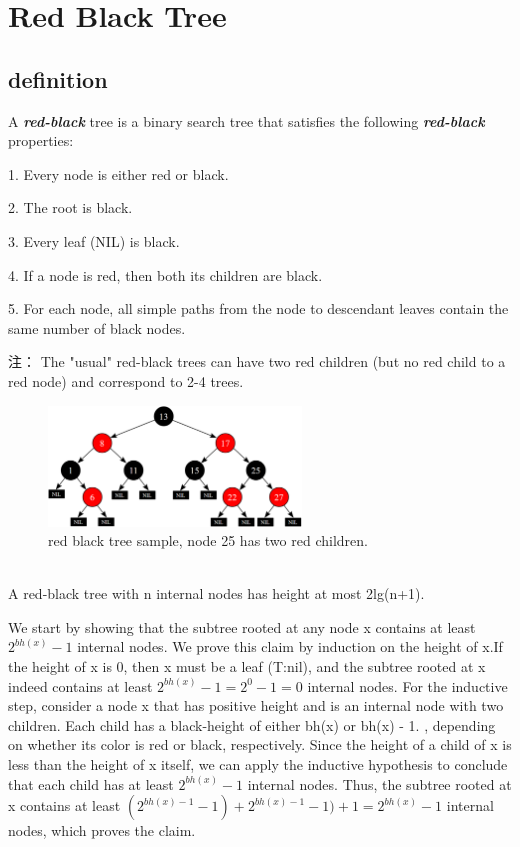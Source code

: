 \documentclass[UTF8,11pt,openany]{ctexbook}
\newcommand{\bolditalic}[1]{\textbf{\textit{#1}}}
\newcommand{\point}[1]{\noindent{\textbf{#1}}}
\begin{document}
\chapter{Red Black Tree}
\section{definition}

A \bolditalic{red-black} tree is a binary search tree that satisfies the following \bolditalic{red-black} properties:

1. Every node is either red or black.

2. The root is black.

3. Every leaf (NIL) is black.

4. If a node is red, then both its children are black.

5. For each node, all simple paths from the node to descendant leaves contain the same number of black nodes.
 
 
注：
  The "usual" red-black trees can have two red children (but no red child to a red node) and correspond to 2-4 trees.
  
  
\begin{figure}[h] %
	\centering %
	\includegraphics[width=0.6\textwidth]{rb_sample.png} %
	\caption{red black tree sample, node 25 has two red children.} %
	\label{red_black_tree_sample1} %
\end{figure}%

 

\point{Proposition 13.1}\\
A red-black tree with n internal nodes has height at most 2lg(n+1).

\point{Proof} We start by showing that the subtree rooted at any node x contains at least
$2^{bh(x)} - 1$ internal nodes. We prove this claim by induction on the height of x.If
the height of x is 0, then x must be a leaf (T:nil), and the subtree rooted at x indeed
contains at least $2^{bh(x)} - 1 = 2^0 - 1 = 0$ internal nodes. For the inductive step,
consider a node x that has positive height and is an internal node with two children.
Each child has a black-height of either bh(x) or bh(x) - 1. , depending on whether
its color is red or black, respectively. Since the height of a child of x is less than
the height of x itself, we can apply the inductive hypothesis to conclude that each
child has at least $2^{bh(x)} - 1$ internal nodes. Thus, the subtree rooted at x contains
at least  $(2^{bh(x)-1} - 1) +2^{bh(x)-1} - 1) +1=2^{bh(x)} - 1 $ internal nodes, which proves
the claim.
\end{document}
